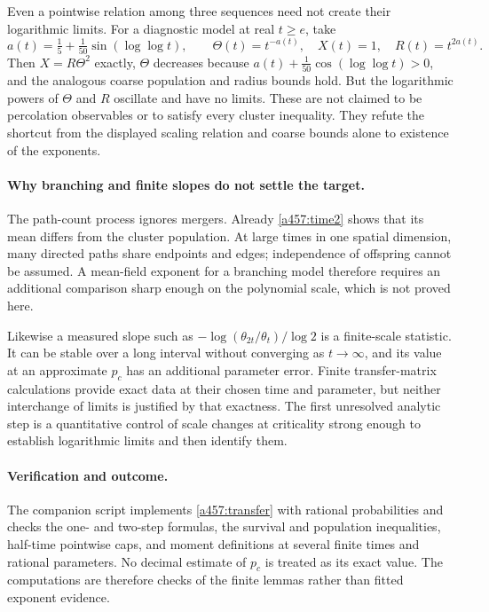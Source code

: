 \documentclass[11pt]{article}
\begin{document}
Even a pointwise relation among three sequences need not create their
logarithmic limits. For a diagnostic model at real $t\ge e$, take
\[
 a(t)=\tfrac15+\tfrac1{50}\sin(\log\log t),\qquad
 \Theta(t)=t^{-a(t)},\quad X(t)=1,\quad R(t)=t^{2a(t)}.
\]
Then $X=R\Theta^2$ exactly, $\Theta$ decreases because
$a(t)+\tfrac1{50}\cos(\log\log t)>0$, and the analogous coarse
population and radius bounds hold. But the logarithmic powers of
$\Theta$ and $R$ oscillate and have no limits. These are not claimed to
be percolation observables or to satisfy every cluster inequality. They
refute the shortcut from the displayed scaling relation and coarse
bounds alone to existence of the exponents.

\paragraph{Why branching and finite slopes do not settle the target.}
The path-count process ignores mergers. Already \eqref{a457:time2}
shows that its mean differs from the cluster population. At large times
in one spatial dimension, many directed paths share endpoints and edges;
independence of offspring cannot be assumed. A mean-field exponent for
a branching model therefore requires an additional comparison sharp
enough on the polynomial scale, which is not proved here.

Likewise a measured slope such as
$-\log(\theta_{2t}/\theta_t)/\log2$ is a finite-scale statistic.
It can be stable over a long interval without converging as $t\to\infty$,
and its value at an approximate $p_c$ has an additional parameter error.
Finite transfer-matrix calculations provide exact data at their chosen
time and parameter, but neither interchange of limits is justified by
that exactness. The first unresolved analytic step is a quantitative
control of scale changes at criticality strong enough to establish
logarithmic limits and then identify them.

\paragraph{Verification and outcome.}
The companion script implements \eqref{a457:transfer} with rational
probabilities and checks the one- and two-step formulas, the survival and
population inequalities, half-time pointwise caps, and moment definitions
at several finite times and rational parameters. No decimal estimate of
$p_c$ is treated as its exact value. The computations are therefore checks
of the finite lemmas rather than fitted exponent evidence.
\end{document}
